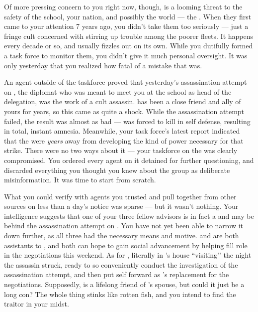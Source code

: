 \documentclass[char]{GL2020}
\begin{document}
Of more pressing concern to you right now, though, is a looming threat to the safety of the school, your nation, and possibly the world — the \pGoaties{}. When they first came to your attention 7 years ago, you didn't take them too seriously — just a fringe cult concerned with stirring up trouble among the poorer \pShippie{} fleets. It happens every decade or so, and usually fizzles out on its own. While you dutifully formed a task force to monitor them, you didn't give it much personal oversight. It was only yesterday that you realized how fatal of a mistake that was. 

An agent outside of the taskforce proved that yesterday's assassination attempt on \cHeadDiplomat{\full}, the diplomat who was meant to meet you at the school as head of the \pShip{} delegation, was the work of a cult assassin. \cHeadDiplomat{} has been a close friend and ally of yours for years, so this came as quite a shock. While the assassination attempt failed, the result was almost as bad — \cHeadDiplomat{} was forced to kill in self defense, resulting in total, instant amnesia. Meanwhile, your task force's latest report indicated that the \pGoaties{} were \emph{years} away from developing the kind of power necessary for that strike. There were no two ways about it — your taskforce on the \pGoaties{} was clearly compromised. You ordered every agent on it detained for further questioning, and discarded everything you thought you knew about the group as deliberate misinformation. It was time to start from scratch.

What you could verify with agents you trusted and pull together from other sources on less than a day's notice was sparse — but it wasn't nothing. Your intelligence suggests that one of your three fellow \pShip{} advisors is in fact a \pGoatie{} and may be behind the assassination attempt on \cHeadDiplomat{}. You have not yet been able to narrow it down further, as all three had the necessary means and motive. \cChupLeader{\full} and \cJuniorStatesman{\full} are both assistants to \cHeadDiplomat{}, and both can hope to gain social advancement by helping fill \cHeadDiplomat{\their} role in the negotiations this weekend. As for \cEbbPriest{\full}, \cEbbPriest{\they} \cEbbPriest{\were} literally in \cHeadDiplomat{}’s house ``visiting’’ the night the assassin struck, ready to so conveniently conduct the investigation of the assassination attempt, and then put \cEbbPriest{\them}self forward as \cHeadDiplomat{}'s replacement for the negotiations. Supposedly, \cEbbPriest{} is a lifelong friend of \cHeadDiplomat{}'s spouse, but could it just be a long con? The whole thing stinks like rotten fish, and you intend to find the traitor in your midst.
\end{document}
